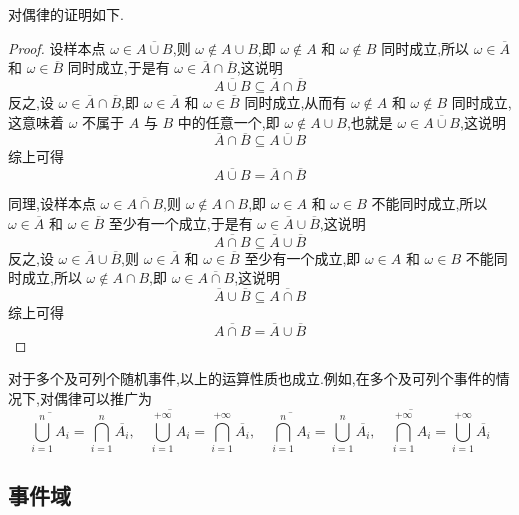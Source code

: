 对偶律的证明如下.

\begin{proof}
    设样本点 $\omega \in \overline{A \cup B}$,则 $\omega \notin A \cup B$,即 $\omega \notin A$ 和 $\omega \notin B$ 同时成立,所以 $\omega \in \overline{A}$ 和 $\omega \in \overline{B}$ 同时成立,于是有 $\omega \in \overline{A} \cap \overline{B}$,这说明
    $$
    \overline{A \cup B} \subseteq \overline{A} \cap \overline{B}
    $$
    反之,设 $\omega \in \overline{A} \cap \overline{B}$,即 $\omega \in \overline{A}$ 和 $\omega \in \overline{B}$ 同时成立,从而有 $\omega \notin A$ 和 $\omega \notin B$ 同时成立,这意味着 $\omega$ 不属于 $A$ 与 $B$ 中的任意一个,即 $\omega \notin A \cup B$,也就是 $\omega \in \overline{A \cup B}$,这说明
    $$
    \overline{A} \cap \overline{B} \subseteq \overline{A \cup B}
    $$
    综上可得
    $$
    \overline{A \cup B} = \overline{A} \cap \overline{B}
    $$

    同理,设样本点 $\omega \in \overline{A \cap B}$,则 $\omega \notin A \cap B$,即 $\omega \in A$ 和 $\omega \in B$ 不能同时成立,所以 $\omega \in \overline{A}$ 和 $\omega \in \overline{B}$ 至少有一个成立,于是有 $\omega \in \overline{A} \cup \overline{B}$,这说明
    $$
    \overline{A \cap B} \subseteq \overline{A} \cup \overline{B}
    $$
    反之,设 $\omega \in \overline{A} \cup \overline{B}$,则 $\omega \in \overline{A}$ 和 $\omega \in \overline{B}$ 至少有一个成立,即 $\omega \in A$ 和 $\omega \in B$ 不能同时成立,所以 $\omega \notin A \cap B$,即 $\omega \in \overline{A \cap B}$,这说明
    $$
    \overline{A} \cup \overline{B} \subseteq \overline{A \cap B}
    $$
    综上可得
    $$
    \overline{A \cap B} = \overline{A} \cup \overline{B}
    $$
\end{proof}

对于多个及可列个随机事件,以上的运算性质也成立.例如,在多个及可列个事件的情况下,对偶律可以推广为
$$
\overline{\bigcup_{i=1}^n A_i} = \bigcap_{i=1}^n \overline{A_i}, \quad \overline{\bigcup_{i=1}^{+\infty} A_i} = \bigcap_{i=1}^{+\infty} \overline{A_i},\quad \overline{\bigcap_{i=1}^n A_i} = \bigcup_{i=1}^n \overline{A_i}, \quad \overline{\bigcap_{i=1}^{+\infty} A_i} = \bigcup_{i=1}^{+\infty} \overline{A_i}
$$

\subsection{事件域}

